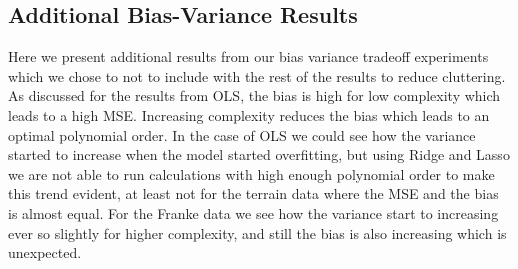 \documentclass[10pt, twocolumn]{article}
\begin{document}
\begin{appendices}
\section{Additional Bias-Variance Results}
\label{asec:Bias_Var_results}
Here we present additional results from our bias variance tradeoff experiments which we chose to not to include with the rest of the results to reduce cluttering. As discussed for the results from OLS, the bias is high for low complexity which leads to a high MSE. Increasing complexity reduces the bias which leads to an optimal polynomial order. In the case of OLS we could see how the variance started to increase when the model started overfitting, but using Ridge and Lasso we are not able to run calculations with high enough polynomial order to make this trend evident, at least not for the terrain data where the MSE and the bias is almost equal. For the Franke data we see how the variance start to increasing ever so slightly for higher complexity, and still the bias is also increasing which is unexpected.


\end{appendices}
\end{document}
